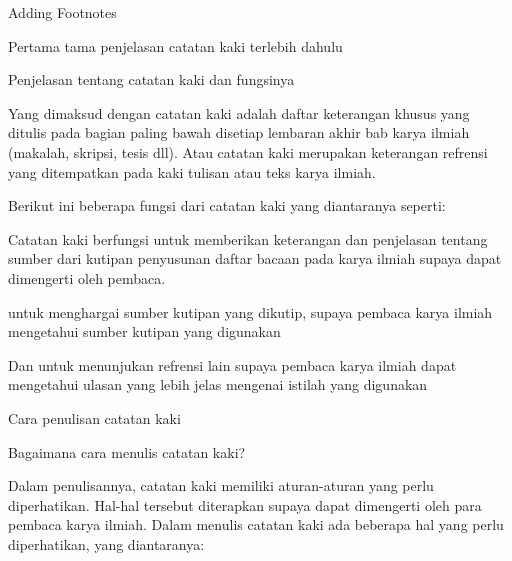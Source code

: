 
\sloppy


{\fontsize{14pt}{14pt}\selectfont Adding Footnotes}


 Pertama tama penjelasan catatan kaki terlebih dahulu\par

Penjelasan tentang catatan kaki dan fungsinya\par


Yang dimaksud dengan catatan kaki adalah daftar keterangan khusus yang ditulis pada bagian paling bawah disetiap lembaran akhir bab karya ilmiah (makalah, skripsi, tesis dll). Atau catatan kaki merupakan keterangan refrensi yang ditempatkan pada kaki tulisan atau teks karya ilmiah.\par

Berikut ini beberapa fungsi dari catatan kaki yang diantaranya seperti:\par



\noindent Catatan kaki berfungsi untuk memberikan keterangan dan penjelasan tentang sumber dari kutipan penyusunan daftar bacaan pada karya ilmiah supaya dapat dimengerti oleh pembaca.\par


\noindent untuk menghargai sumber kutipan yang dikutip, supaya pembaca karya ilmiah mengetahui sumber kutipan yang digunakan\par


\noindent Dan untuk menunjukan refrensi lain supaya pembaca karya ilmiah dapat mengetahui ulasan yang lebih jelas mengenai istilah yang digunakan\par


\noindent Cara penulisan catatan kaki\par


\noindent Bagaimana cara menulis catatan kaki?\par

Dalam penulisannya, catatan kaki memiliki aturan-aturan yang perlu diperhatikan. Hal-hal tersebut diterapkan supaya dapat dimengerti oleh para pembaca karya ilmiah. Dalam menulis catatan kaki ada beberapa hal yang perlu diperhatikan, yang diantaranya:\par

